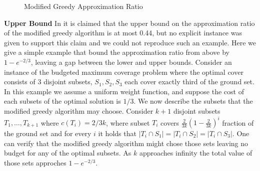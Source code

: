\begin{figure}
\caption{
\label{fig:mgreedy}
Modified Greedy Approximation Ratio
}
\end{figure}

\textbf{Upper Bound}
In \cite{khuller1999budgeted} it is claimed that the upper bound on the approximation ratio
of the modified greedy algorithm is at most 0.44, but no explicit instance was given to 
support this claim and we could not reproduce such an example.
Here we give a simple example that bound the approximation ratio from above by $1-e^{-2/3}$, 
leaving a gap between the lower and upper bounds.
Consider an instance of the budgeted maximum coverage problem where the optimal cover consists
of 3 disjoint subsets, $S_1, S_2, S_3$ each cover exactly third of the ground set. 
In this example we assume a uniform weight function, and suppose the cost of each subsets of 
the optimal solution is $1/3$. We now describe the subsets that the modified greedy algorithm
may choose. Consider $k + 1$ disjoint subsets $T_1, \dots, T_{k + 1}$ where $c(T_i) = 2/3k$, 
where subset $T_i$ covers $\frac{2}{3k}(1-\frac{2}{3k})^i$ fraction of the ground set and for
every $i$ it holds that $|T_i \cap S_1| = |T_i \cap S_2| = |T_i \cap S_3|$.
One can verify that the modified greedy algorithm might chose those sets leaving no budget for
any of the optimal subsets. As $k$ approaches infinity the total value of those sets approches
$1-e^{-2/3}$. 



  
